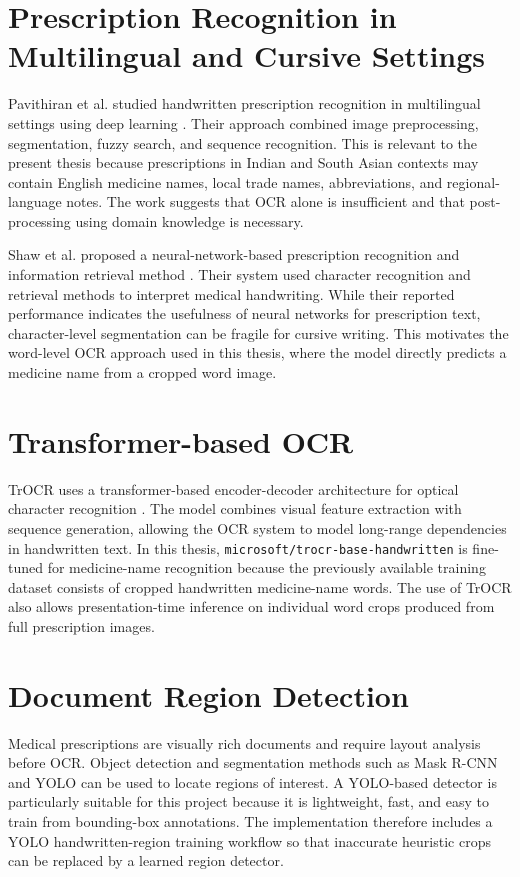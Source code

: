 \documentclass[modernstyle,12pt]{thesis}
\begin{document}
\section{Prescription Recognition in Multilingual and Cursive Settings}

Pavithiran et al. studied handwritten prescription recognition in multilingual settings using deep learning \cite{pavithiran2024multilingual}. Their approach combined image preprocessing, segmentation, fuzzy search, and sequence recognition. This is relevant to the present thesis because prescriptions in Indian and South Asian contexts may contain English medicine names, local trade names, abbreviations, and regional-language notes. The work suggests that OCR alone is insufficient and that post-processing using domain knowledge is necessary.

Shaw et al. proposed a neural-network-based prescription recognition and information retrieval method \cite{utkarshaw2021}. Their system used character recognition and retrieval methods to interpret medical handwriting. While their reported performance indicates the usefulness of neural networks for prescription text, character-level segmentation can be fragile for cursive writing. This motivates the word-level OCR approach used in this thesis, where the model directly predicts a medicine name from a cropped word image.

\section{Transformer-based OCR}

TrOCR uses a transformer-based encoder-decoder architecture for optical character recognition \cite{li2023trocr}. The model combines visual feature extraction with sequence generation, allowing the OCR system to model long-range dependencies in handwritten text. In this thesis, \texttt{microsoft/trocr-base-handwritten} is fine-tuned for medicine-name recognition because the previously available training dataset consists of cropped handwritten medicine-name words. The use of TrOCR also allows presentation-time inference on individual word crops produced from full prescription images.

\section{Document Region Detection}

Medical prescriptions are visually rich documents and require layout analysis before OCR. Object detection and segmentation methods such as Mask R-CNN \cite{he2017mask} and YOLO \cite{jocher2023yolo} can be used to locate regions of interest. A YOLO-based detector is particularly suitable for this project because it is lightweight, fast, and easy to train from bounding-box annotations. The implementation therefore includes a YOLO handwritten-region training workflow so that inaccurate heuristic crops can be replaced by a learned region detector.
\end{document}
